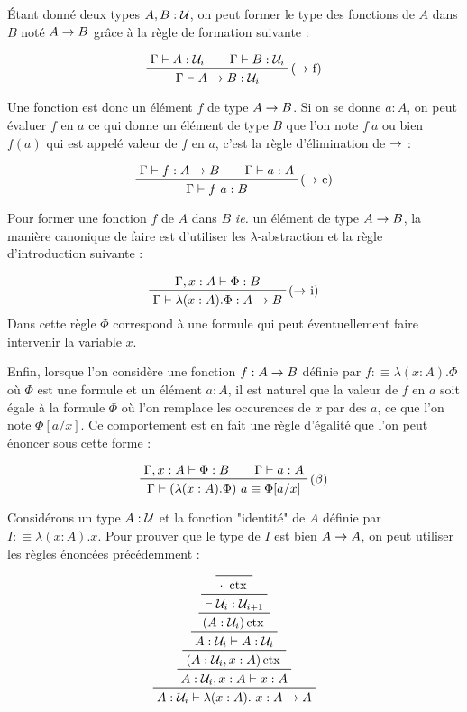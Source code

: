 \documentclass[../../rapport.tex]{subfiles}
\begin{document}
  Étant donné deux types $A, B : \mathcal U$, on peut former le type des fonctions de $A$ dans $B$ noté $A \rightarrow B$
  grâce à la règle de formation suivante :

  $$
  \prfinterspace=2em
  \prftree[r]{($\fun$ f)}{\Gamma \vdash A : \U_i}{\Gamma \vdash B : \U_i}{\Gamma \vdash A \fun B : \U_i}
  $$

  Une fonction est donc un élément $f$ de type $A \rightarrow B$.
  Si on se donne $a : A$, on peut évaluer $f$ en $a$ ce qui donne un élément de type $B$
  que l'on note $f\ a$ ou bien $f(a)$ qui est appelé valeur de $f$ en $a$, c'est la règle d'élimination de $\rightarrow$ :

  $$
  \prfinterspace=2em
  \prftree[r]{($\fun$ e)}{\Gamma \vdash f : A \fun B}{\Gamma \vdash a : A}{\Gamma \vdash f\ a : B}
  $$

  Pour former une fonction $f$ de $A$ dans $B$ \textit{ie.} un élément de type $A \rightarrow B$,
  la manière canonique de faire est d'utiliser les $\lambda$-abstraction et la règle d'introduction suivante :

  $$
  \prftree[r]{($\fun$ i)}{\Gamma, x : A \vdash \Phi : B}{\Gamma \vdash \lambda (x : A). \Phi : A \fun B}
  $$
  Dans cette règle $\Phi$ correspond à une formule qui peut éventuellement faire intervenir la variable $x$.

  Enfin, lorsque l'on considère une fonction $f : A \rightarrow B$ définie par $f :\equiv \lambda (x : A). \Phi$
  où $\Phi$ est une formule et un élément $a : A$, il est naturel que la valeur de $f$ en $a$ soit égale à
  la formule $\Phi$ où l'on remplace les occurences de $x$ par des $a$, ce que l'on note $\Phi[a/x]$.
  Ce comportement est en fait une règle d'égalité que l'on peut énoncer sous cette forme :

  $$
  \prfinterspace=2em
  \prftree[r]{($\beta$)}{\Gamma, x : A \vdash \Phi : B}{\Gamma \vdash a : A}
    {\Gamma \vdash (\lambda(x : A).\Phi)\ a \equiv \Phi[a/x]}
  $$

  \begin{example}
    Considérons un type $A : \mathcal U$ et la fonction "identité" de $A$ définie par $I :\equiv \lambda(x : A).x$.
    Pour prouver que le type de $I$ est bien $A \rightarrow A$, on peut utiliser les règles énoncées précédemment :

    $$
    \prftree
      {\prftree
	{\prftree
	  {\prftree
	    {\prftree
	      {\prftree
		{\prfaxiom{\cdot\ \ctx}}
	      {\vdash \U_i : \U_{i+1}}}
	    {(A : \U_i) \ctx}}
	  {A : \U_i \vdash A : \U_i}}
	{(A : \U_i, x : A) \ctx}}
      {A : \U_i, x : A \vdash x : A}}
    {A : \U_i \vdash \lambda(x:A).\ x : A \fun A}
    $$
  \end{example}
\end{document}
